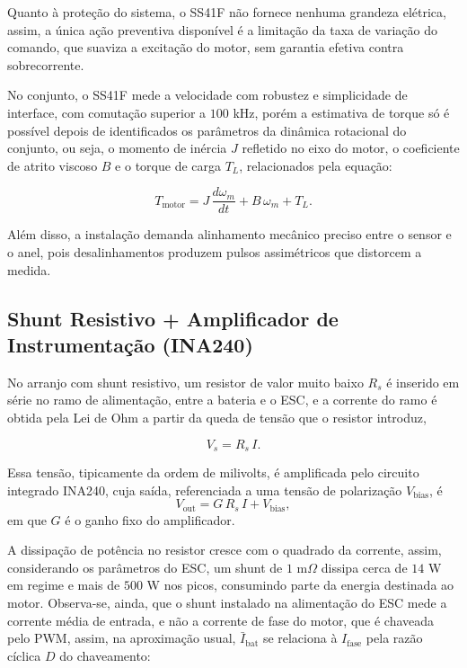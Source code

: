Quanto à proteção do sistema, o SS41F não fornece nenhuma grandeza elétrica, assim, a única
ação preventiva disponível é a limitação da taxa de variação do comando, que suaviza a
excitação do motor, sem garantia efetiva contra sobrecorrente.

No conjunto, o SS41F mede a velocidade com robustez e simplicidade de interface, com
comutação superior a $100$ kHz, porém a estimativa de torque só é possível depois de identificados os parâmetros da
dinâmica rotacional do conjunto, ou seja, o momento de inércia $J$ refletido no eixo do motor,
o coeficiente de atrito viscoso $B$ e o torque de carga $T_L$, relacionados pela equação:

\begin{equation}\label{eq:dinamica_rotacional}
T_{\text{motor}} = J\,\frac{d\omega_m}{dt} + B\,\omega_m + T_L.
\end{equation}

Além disso, a instalação demanda alinhamento mecânico
preciso entre o sensor e o anel, pois desalinhamentos produzem pulsos assimétricos que
distorcem a medida.

\subsection{Shunt Resistivo + Amplificador de Instrumentação (INA240)}
\label{sec:ina240}

No arranjo com shunt resistivo, um resistor de valor muito baixo $R_s$ é inserido em
série no ramo de alimentação, entre a bateria e o ESC, e a corrente do ramo é obtida pela Lei
de Ohm a partir da queda de tensão que o resistor introduz,

\begin{equation}
V_s = R_s\,I.
\end{equation}

Essa tensão, tipicamente da ordem de milivolts, é amplificada pelo circuito integrado INA240, cuja
saída, referenciada a uma tensão de polarização $V_\mathrm{bias}$, é
\begin{equation*}
V_\mathrm{out} = G\,R_s\,I + V_\mathrm{bias},
\end{equation*}
em que $G$ é o ganho fixo do amplificador. 

A dissipação de potência no resistor cresce com o quadrado da corrente, assim, considerando os parâmetros do
ESC, um shunt de $1$ m$\Omega$ dissipa cerca de $14$ W
em regime e mais de $500$ W nos picos, consumindo parte da energia
destinada ao motor. Observa-se, ainda, que o shunt instalado na alimentação do ESC mede a
corrente média de entrada, e não a corrente de fase do motor, que é chaveada pelo PWM, assim, na aproximação
usual, $\bar{I}_\mathrm{bat}$ se relaciona à $I_\mathrm{fase}$ pela razão cíclica $D$ do chaveamento:

